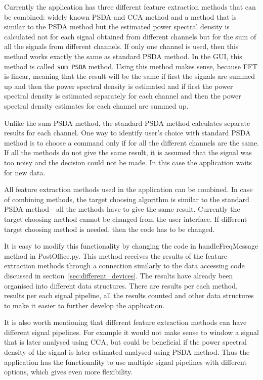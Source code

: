 Currently the application has three different \gls{feature extraction} methods that can be combined: widely known \gls{PSDA} and \gls{CCA} method and a method that is similar to the \gls{PSDA} method but the estimated \gls{power spectral density} is calculated not for each signal obtained from different channels but for the sum of all the signals from different channels. If only one channel is used, then this method works exactly the same as standard \gls{PSDA} method. In the \gls{GUI}, this method is called \texttt{sum \gls{PSDA}} method. Using this method makes sense, because \gls{FFT} is linear, meaning that the result will be the same if first the signals are summed up and then the \gls{power spectral density} is estimated and if first the \gls{power spectral density} is estimated separately for each channel and then the \gls{power spectral density} estimates for each channel are summed up.

Unlike the sum \gls{PSDA} method, the standard \gls{PSDA} method calculates separate results for each channel. One way to identify user's choice with standard \gls{PSDA} method is to choose a command only if for all the different channels are the same. If all the methods do not give the same result, it is assumed that the signal was too noisy and the decision could not be made. In this case the application waits for new data.

All \gls{feature extraction} methods used in the application can be combined. In case of combining methods, the \gls{target} choosing algorithm is similar to the standard \gls{PSDA} method---all the methods have to give the same result. Currently the \gls{target} choosing method cannot be changed from the user interface. If different \gls{target} choosing method is needed, then the code has to be changed.

It is easy to modify this functionality by changing the code in handleFreqMessage method in PostOffice.py. This method receives the results of the \gls{feature extraction} methods through a connection similarly to the data accessing code discussed in section~\ref{sec:different_devices}. The results have already been organised into different data structures. There are results per each method, results per each signal pipeline, all the results counted and other data structures to make it easier to further develop the application.

It is also worth mentioning that different \gls{feature extraction} methods can have different signal pipelines. For example it would not make sense to \gls{window} a signal that is later analysed using \gls{CCA}, but  could be beneficial if the \gls{power spectral density} of the signal is later estimated analysed using \gls{PSDA} method. Thus the application has the functionality to use multiple signal pipelines with different options, which gives even more flexibility.

